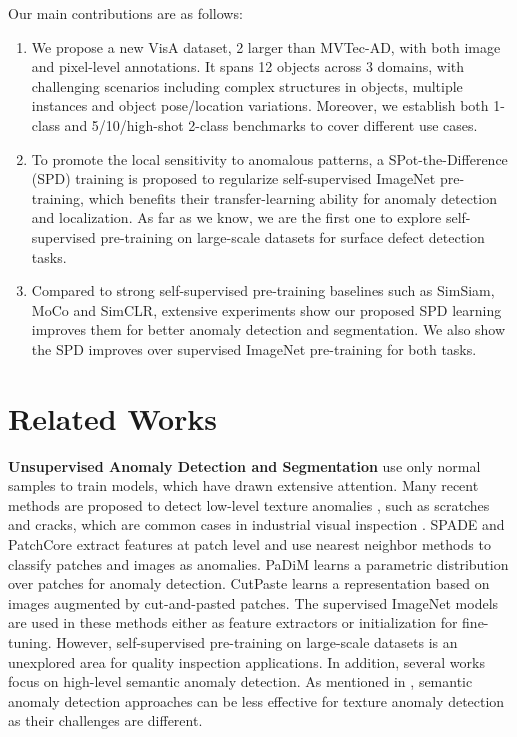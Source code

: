 \documentclass[runningheads]{llncs}
\begin{document}
Our main contributions are as follows:
\begin{enumerate}
    \item We propose a new VisA dataset, 2 larger than MVTec-AD, with both image and pixel-level annotations. It spans 12 objects across 3 domains, with challenging scenarios including complex structures in objects, multiple instances and object pose/location variations. Moreover, we establish both 1-class and 5/10/high-shot 2-class benchmarks to cover different use cases.
    \item To promote the local sensitivity to anomalous patterns, a SPot-the-Difference (SPD) training is proposed to regularize self-supervised ImageNet pre-training, which benefits their transfer-learning ability for anomaly detection and localization. As far as we know, we are the first one to explore self-supervised pre-training on large-scale datasets for surface defect detection tasks. 
\item Compared to strong self-supervised pre-training baselines such as SimSiam, MoCo and SimCLR, extensive experiments show our proposed SPD learning improves them for better anomaly detection and segmentation. We also show the SPD improves over supervised ImageNet pre-training for both tasks. 
\end{enumerate}
\section{Related Works}
\noindent\textbf{Unsupervised Anomaly Detection and Segmentation} use only normal samples to train models, which have drawn extensive attention. Many recent methods are proposed to detect low-level texture anomalies \cite{ruff2021unifying}, such as scratches and cracks, which are common cases in industrial visual inspection \cite{Deng_2022_CVPR,Ristea-CVPR-2022,RudWeh2022,yi2020patch}. SPADE \cite{defard2021padim} and PatchCore \cite{Roth_2022_CVPR} extract features at patch level and use nearest neighbor methods to classify patches and images as anomalies. PaDiM \cite{defard2021padim} learns a parametric distribution over patches for anomaly detection. CutPaste \cite{li2021cutpaste} learns a representation based on images augmented by cut-and-pasted patches. The supervised ImageNet models are used in these methods either as feature extractors or initialization for fine-tuning. However, self-supervised pre-training on large-scale datasets is an unexplored area for quality inspection applications. In addition, several works \cite{reiss2021mean,sohn2021learning,tack2020csi,pmlr-v80-ruff18a} focus on high-level semantic anomaly detection. As mentioned in \cite{ruff2021unifying}, semantic anomaly detection approaches can be less effective for texture anomaly detection as their challenges are different.
\end{document}
